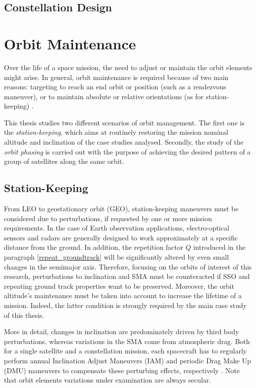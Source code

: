 \subsection{Constellation Design}


\section{Orbit Maintenance}
Over the life of a space mission, the need to adjust or maintain the orbit elements might arise. In general, orbit maintenance is required because of two main reasons:
 targeting to reach an end orbit or position (such as a rendezvous maneuver), or to maintain absolute or relative orientations (as for station-keeping) \cite{wertz2009orbit}.

This thesis studies two different scenarios of orbit management. 
The first one is the \textit{station-keeping}, which aims at routinely restoring the mission nominal altitude and inclination of the case studies analysed. 
Secondly, the study of the \textit{orbit phasing} is carried out with the purpose of achieving the desired pattern of a group of satellites along the same orbit.

\subsection{Station-Keeping}
From LEO to geostationary orbit (GEO), station-keeping maneuvers must be considered due to perturbations, if requested by one or more mission requirements.  
In the case of Earth observation applications, electro-optical sensors and radars are generally designed to work approximately at a specific distance from the ground. 
In addition, the repetition factor $Q$ introduced in the paragraph \ref{repeat_groundtrack} will be significantly altered by even small changes in the semimajor axis.
Therefore, focusing on the orbits of interest of this research, perturbations to inclination and SMA must be counteracted if SSO and repeating ground track properties want to be preserved.
Moreover, the orbit altitude's maintenance must be taken into account to increase the lifetime of a mission.
Indeed, the latter condition is strongly required by the main case study of this thesis.

More in detail, changes in inclination are predominately driven by third body perturbations, whereas variations in the SMA come from atmospheric drag.
Both for a single satellite and a constellation mission, each spacecraft has to regularly perform annual Inclination Adjust Maneuvers (IAM) and periodic Drag Make Up (DMU) maneuvers to compensate these perturbing effects, respectively \cite{johnson2014maintaining}.
Note that orbit elements variations under examination are always secular.

